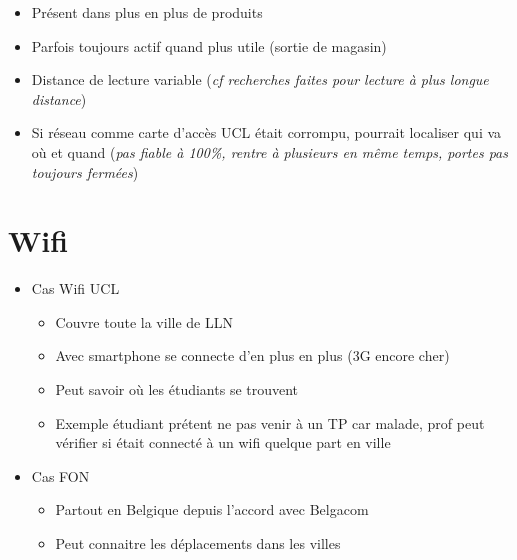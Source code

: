\begin{itemize}
\item Présent dans plus en plus de produits
\item Parfois toujours actif quand plus utile (sortie de magasin)
\item Distance de lecture variable (\emph{cf recherches faites pour lecture à plus longue distance})
\item Si réseau comme carte d'accès UCL était corrompu, pourrait localiser qui va où et quand (\emph{pas fiable à 100\%, rentre à plusieurs en même temps, portes pas toujours fermées})
\end{itemize}

\section*{Wifi}

\begin{itemize}
\item Cas Wifi UCL
  \begin{itemize}
  \item Couvre toute la ville de LLN
  \item Avec smartphone se connecte d'en plus en plus (3G encore cher)
  \item Peut savoir où les étudiants se trouvent
  \item Exemple étudiant prétent ne pas venir à un TP car malade, prof peut vérifier si était connecté à un wifi quelque part en ville
  \end{itemize}
\item Cas FON
  \begin{itemize}
  \item Partout en Belgique depuis l'accord avec Belgacom
  \item Peut connaitre les déplacements dans les villes
  \end{itemize}

\end{itemize}

